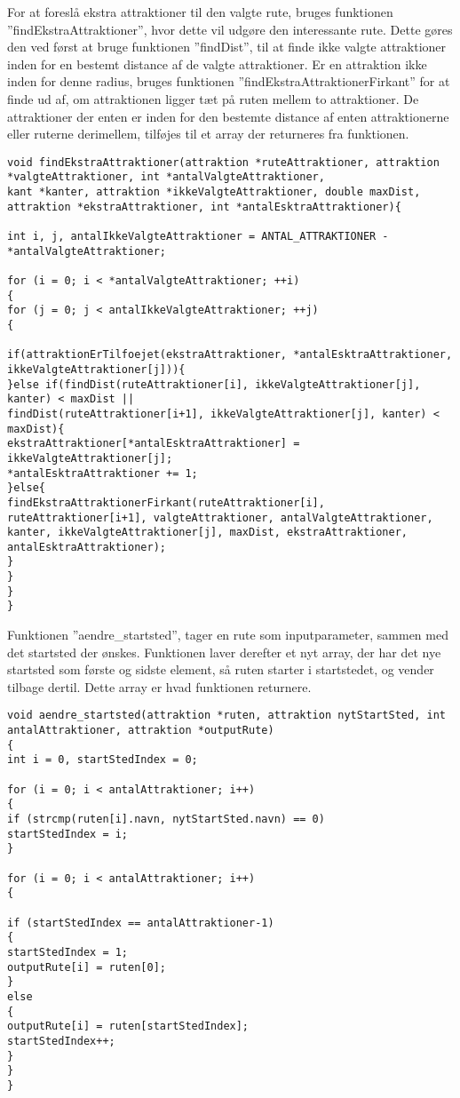 For at foreslå ekstra attraktioner til den valgte rute, bruges funktionen ”findEkstraAttraktioner”, hvor dette vil udgøre den interessante rute. Dette gøres den ved først at bruge funktionen ”findDist”, til at finde ikke valgte attraktioner inden for en bestemt distance af de valgte attraktioner. Er en attraktion ikke inden for denne radius, bruges funktionen ”findEkstraAttraktionerFirkant” for at finde ud af, om attraktionen ligger tæt på ruten mellem to attraktioner. De attraktioner der enten er inden for den bestemte distance af enten attraktionerne eller ruterne derimellem, tilføjes til et array der returneres fra funktionen. \newline

\begin{lstlisting}
void findEkstraAttraktioner(attraktion *ruteAttraktioner, attraktion *valgteAttraktioner, int *antalValgteAttraktioner, 
kant *kanter, attraktion *ikkeValgteAttraktioner, double maxDist, attraktion *ekstraAttraktioner, int *antalEsktraAttraktioner){

int i, j, antalIkkeValgteAttraktioner = ANTAL_ATTRAKTIONER - *antalValgteAttraktioner;

for (i = 0; i < *antalValgteAttraktioner; ++i)
{
for (j = 0; j < antalIkkeValgteAttraktioner; ++j)
{

if(attraktionErTilfoejet(ekstraAttraktioner, *antalEsktraAttraktioner, ikkeValgteAttraktioner[j])){
}else if(findDist(ruteAttraktioner[i], ikkeValgteAttraktioner[j], kanter) < maxDist || 
findDist(ruteAttraktioner[i+1], ikkeValgteAttraktioner[j], kanter) < maxDist){
ekstraAttraktioner[*antalEsktraAttraktioner] = ikkeValgteAttraktioner[j];
*antalEsktraAttraktioner += 1;
}else{
findEkstraAttraktionerFirkant(ruteAttraktioner[i], ruteAttraktioner[i+1], valgteAttraktioner, antalValgteAttraktioner,
kanter, ikkeValgteAttraktioner[j], maxDist, ekstraAttraktioner, antalEsktraAttraktioner);
}
}
}
}
\end{lstlisting}

Funktionen ”aendre\_startsted”, tager en rute som inputparameter, sammen med det startsted der ønskes. Funktionen laver derefter et nyt array, der har det nye startsted som første og sidste element, så ruten starter i startstedet, og vender tilbage dertil. Dette array er hvad funktionen returnere.  \newline

\begin{lstlisting}
void aendre_startsted(attraktion *ruten, attraktion nytStartSted, int antalAttraktioner, attraktion *outputRute)
{
int i = 0, startStedIndex = 0;

for (i = 0; i < antalAttraktioner; i++)
{
if (strcmp(ruten[i].navn, nytStartSted.navn) == 0)
startStedIndex = i;
}

for (i = 0; i < antalAttraktioner; i++)
{

if (startStedIndex == antalAttraktioner-1)
{
startStedIndex = 1;
outputRute[i] = ruten[0];
}
else
{
outputRute[i] = ruten[startStedIndex];
startStedIndex++;
}
}
}
\end{lstlisting}

